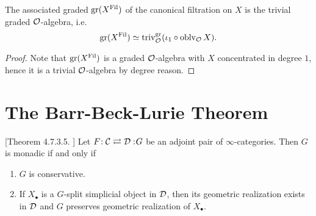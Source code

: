 \begin{proposition}
	\label{canonical filtration}
	The associated graded $\operatorname{gr}(X^{\operatorname{Fil}})$ of the canonical filtration on $X$ is the trivial graded ${\mathcal{O}}$-algebra, i.e. 
	$$
	\operatorname{gr}(X^{\operatorname{Fil}}) \simeq \operatorname{triv}^{\operatorname{gr}}_{{\mathcal{O}}}(\iota_{1} \circ \operatorname{oblv}_{{\mathcal{O}}}X).
	$$
\end{proposition}
\begin{proof}
	Note that $\operatorname{gr}(X^{\operatorname{Fil}})$ is a graded ${\mathcal{O}}$-algebra with $X$ concentrated in degree $1$, hence it is a trivial ${\mathcal{O}}$-algebra by degree reason.
	
	
	
	
\end{proof}
	










\clearpage







\section{The Barr-Beck-Lurie Theorem}
\begin{theorem}
\label{Barr-Beck-Lurie theorem}
	[Theorem 4.7.3.5. \cite{HA}]
	Let $F\negmedspace: {\mathcal{C}}\rightleftarrows {\mathcal{D}}:\negmedspace G$ be an adjoint pair of $\infty$-categories. Then $G$ is monadic if and only if 
	\begin{enumerate}
		\item $G$ is conservative.
		\item If $X_\bullet$ is a $G$-split simplicial object in ${\mathcal{D}}$, then its geometric realization exists in ${\mathcal{D}}$ and $G$ preserves geometric realization of $X_{\bullet}$.
	\end{enumerate}
\end{theorem}

